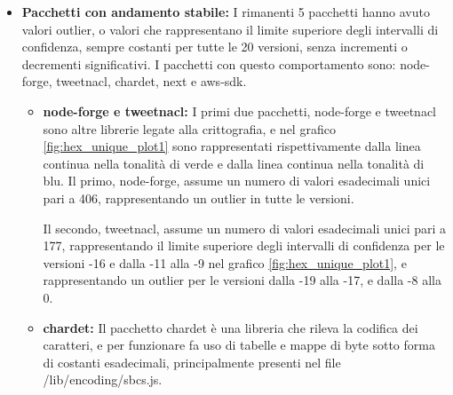 \begin{itemize}
\begin{itemize}

Il pacchetto object-hash ha seguito questa best practice, 
e a partire dalla versione 1.1.7 (-12 nel grafico \ref{fig:hex_unique_plot1})
ha ridotto prima il numero di test, e di conseguenza diminuito il numero di valori esadecimali unici da 78 a 5.
Successivamente, dalla versione 2.0.3 (-4 nel grafico \ref{fig:hex_unique_plot1}),
ha rimosso completamente il file di test dal tarball, portando il numero di valori esadecimali unici a 0.

    \end{itemize}

    \item \textbf{Pacchetti con andamento stabile:}
I rimanenti 5 pacchetti hanno avuto valori outlier, o valori che rappresentano il limite superiore degli intervalli di confidenza,
sempre costanti per tutte le 20 versioni, senza incrementi o decrementi significativi.
I pacchetti con questo comportamento sono: node-forge, tweetnacl, chardet, next e aws-sdk.

    \begin{itemize}
        \item \textbf{node-forge e tweetnacl:}
I primi due pacchetti, node-forge e tweetnacl sono altre librerie legate alla crittografia,
e nel grafico \ref{fig:hex_unique_plot1} sono rappresentati rispettivamente dalla linea continua nella tonalità di verde 
e dalla linea continua nella tonalità di blu.
Il primo, node-forge, assume un numero di valori esadecimali unici pari a 406, 
rappresentando un outlier in tutte le versioni.

Il secondo, tweetnacl, assume un numero di valori esadecimali unici pari a 177,
rappresentando il limite superiore degli intervalli di confidenza per le versioni -16 e dalla -11 alla -9
nel grafico \ref{fig:hex_unique_plot1}, e rappresentando un outlier per le versioni dalla -19 alla -17, e dalla -8 alla 0.

        \item \textbf{chardet:}
Il pacchetto chardet è una libreria che rileva la codifica dei caratteri, e per funzionare 
fa uso di tabelle e mappe di byte sotto forma di costanti esadecimali, 
principalmente presenti nel file /lib/encoding/sbcs.js.


\end{itemize}
\end{itemize}
